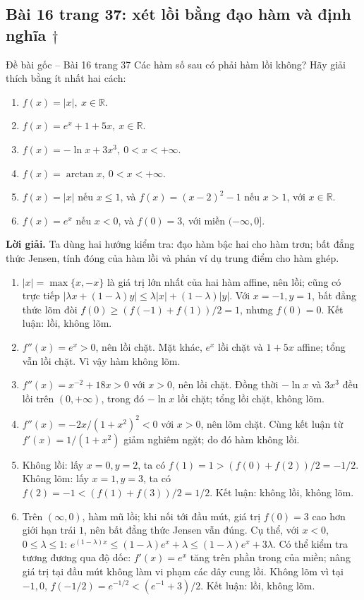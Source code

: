 \documentclass[11pt,a4paper]{article}
\newcommand{\R}{\mathbb{R}}
\begin{document}
\subsection{Bài 16 trang 37: xét lồi bằng đạo hàm và định nghĩa \(\dagger\)}
\begin{questionbox}{Đề bài gốc -- Bài 16 trang 37}
Các hàm số sau có phải hàm lồi không? Hãy giải thích bằng ít nhất hai cách:
\begin{enumerate}[label=\roman*),nosep,leftmargin=*]
\item \(f(x)=|x|,\ x\in\R\).
\item \(f(x)=e^x+1+5x,\ x\in\R\).
\item \(f(x)=-\ln x+3x^3,\ 0<x<+\infty\).
\item \(f(x)=\arctan x,\ 0<x<+\infty\).
\item \(f(x)=|x|\) nếu \(x\le1\), và \(f(x)=(x-2)^2-1\) nếu \(x>1\), với \(x\in\R\).
\item \(f(x)=e^x\) nếu \(x<0\), và \(f(0)=3\), với miền \(( -\infty,0]\).
\end{enumerate}
\end{questionbox}
\textbf{Lời giải.} Ta dùng hai hướng kiểm tra: đạo hàm bậc hai cho hàm trơn; bất đẳng thức Jensen, tính đóng của hàm lồi và phản ví dụ trung điểm cho hàm ghép.
\begin{enumerate}[label=\roman*),nosep,leftmargin=*]
\item \(|x|=\max\{x,-x\}\) là giá trị lớn nhất của hai hàm affine, nên lồi; cũng có trực tiếp \(|\lambda x+(1-\lambda)y|\le\lambda|x|+(1-\lambda)|y|\). Với \(x=-1,y=1\), bất đẳng thức lõm đòi \(f(0)\ge(f(-1)+f(1))/2=1\), nhưng \(f(0)=0\). Kết luận: lồi, không lõm.
\item \(f''(x)=e^x>0\), nên lồi chặt. Mặt khác, \(e^x\) lồi chặt và \(1+5x\) affine; tổng vẫn lồi chặt. Vì vậy hàm không lõm.
\item \(f''(x)=x^{-2}+18x>0\) với \(x>0\), nên lồi chặt. Đồng thời \(-\ln x\) và \(3x^3\) đều lồi trên \((0,+\infty)\), trong đó \(-\ln x\) lồi chặt; tổng lồi chặt, không lõm.
\item \(f''(x)=-2x/(1+x^2)^2<0\) với \(x>0\), nên lõm chặt. Cùng kết luận từ \(f'(x)=1/(1+x^2)\) giảm nghiêm ngặt; do đó hàm không lồi.
\item Không lồi: lấy \(x=0,y=2\), ta có \(f(1)=1>(f(0)+f(2))/2=-1/2\). Không lõm: lấy \(x=1,y=3\), ta có \(f(2)=-1<(f(1)+f(3))/2=1/2\). Kết luận: không lồi, không lõm.
\item Trên \((\infty,0)\), hàm mũ lồi; khi nối tới đầu mút, giá trị \(f(0)=3\) cao hơn giới hạn trái \(1\), nên bất đẳng thức Jensen vẫn đúng. Cụ thể, với \(x<0\), \(0\le\lambda\le1\): \(e^{(1-\lambda)x}\le(1-\lambda)e^x+\lambda\le(1-\lambda)e^x+3\lambda\). Có thể kiểm tra tương đương qua độ dốc: \(f\prime(x)=e^x\) tăng trên phần trong của miền; nâng giá trị tại đầu mút không làm vi phạm các dây cung lồi. Không lõm vì tại \(-1,0\), \(f(-1/2)=e^{-1/2}<(e^{-1}+3)/2\). Kết luận: lồi, không lõm.
\end{enumerate}
\end{document}
